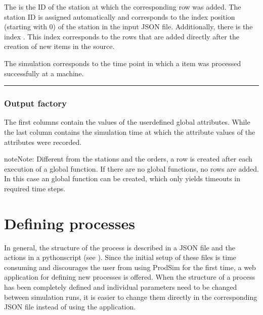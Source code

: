 \documentclass[letterpaper,10pt,english]{sphinxmanual}
\begin{document}
\sphinxAtStartPar
The  is the ID of the station at which the corresponding row was added. The station ID is assigned
automatically and corresponds to the index position (starting with 0) of the station in the input JSON file.
Additionally, there is the index . This index corresponds to the rows that are added directly after the creation of
new items in the source.

\sphinxAtStartPar
The simulation  corresponds to the time point in which a item was processed successfully at a machine.


\bigskip\hrule\bigskip



\subsubsection{Output factory}
\label{\detokenize{source/Interface_files/output_file:output-factory}}\label{\detokenize{source/Interface_files/output_file:id4}}
\sphinxAtStartPar
The first columns contain the values of the user\sphinxhyphen{}defined global attributes. While the last column contains the
simulation time at which the attribute values of the attributes were recorded.


\begin{sphinxadmonition}{note}{Note:}
\sphinxAtStartPar
Different from the stations and the orders, a row is created after each execution of a global function. If there are
no global functions, no rows are added. In this case an  global function can be created, which only yields
timeouts in required time steps.
\end{sphinxadmonition}


\section{Defining processes}
\label{\detokenize{source/Defining_processes/defining_processes:first}}\label{\detokenize{source/Defining_processes/defining_processes:defining-processes}}\label{\detokenize{source/Defining_processes/defining_processes:id1}}\label{\detokenize{source/Defining_processes/defining_processes::doc}}
\sphinxAtStartPar
In general, the structure of the process is described in a JSON file and the actions in a python\sphinxhyphen{}script (see
{\hyperref[\detokenize{source/Interface_files/interface:interface}]{}}). Since the initial setup of these files is time consuming and discourages the user from using ProdSim
for the first time, a web application for defining new processes is offered. When the structure of a process has been
completely defined and individual parameters need to be changed between simulation runs, it is easier to change them
directly in the corresponding JSON file instead of using the application.
\end{document}
